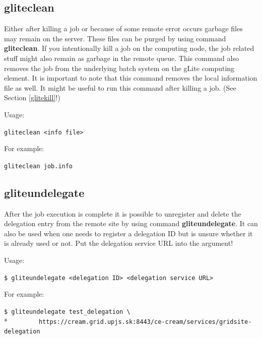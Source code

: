 \documentclass{article}
\begin{document}
\subsection{gliteclean}
\label{gliteclean}
Either after killing a job or because of some remote error occurs garbage files may remain on the server. These files can be purged by using command \textbf{gliteclean}. If you intentionally kill a job on the computing node, the job related stuff might also remain as garbage in the remote queue. This command also removes the job from the underlying batch system on the gLite computing element. It is important to note that this command removes the local information file as well. It might be useful to run this command after killing a job. (See Section \ref{glitekill}!)\par
Usage:
\begin{shaded}\verb#gliteclean <info file>#\end{shaded}
For example:
\begin{shaded}\verb#gliteclean job.info#\end{shaded}
\subsection{gliteundelegate}
\label{gliteundelegate}
After the job execution is complete it is possible to unregister and delete the delegation entry from the remote site by using command \textbf{gliteundelegate}. It can also be used when one needs to register a delegation ID but is unsure whether it is already used or not. Put the delegation service URL into the argument!\par
Usage:
\begin{shaded}\verb#$ gliteundelegate <delegation ID> <delegation service URL>#\end{shaded}
For example:
\begin{shaded}\verb#$ gliteundelegate test_delegation \#\\*
\verb#        https://cream.grid.upjs.sk:8443/ce-cream/services/gridsite-delegation#\end{shaded}
\end{document}
